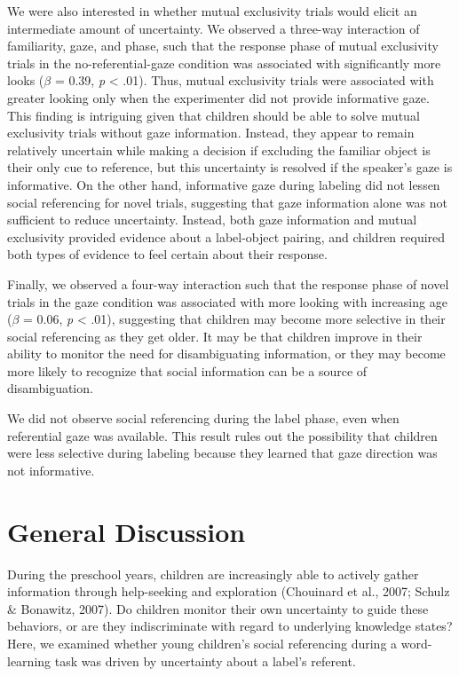 \documentclass[10pt, letterpaper]{article}
\begin{document}
We were also interested in whether mutual exclusivity trials would
elicit an intermediate amount of uncertainty. We observed a three-way
interaction of familiarity, gaze, and phase, such that the response
phase of mutual exclusivity trials in the no-referential-gaze condition
was associated with significantly more looks (\emph{\(\beta\)} = 0.39,
\emph{p} \textless{} .01). Thus, mutual exclusivity trials were
associated with greater looking only when the experimenter did not
provide informative gaze. This finding is intriguing given that children
should be able to solve mutual exclusivity trials without gaze
information. Instead, they appear to remain relatively uncertain while
making a decision if excluding the familiar object is their only cue to
reference, but this uncertainty is resolved if the speaker's gaze is
informative. On the other hand, informative gaze during labeling did not
lessen social referencing for novel trials, suggesting that gaze
information alone was not sufficient to reduce uncertainty. Instead,
both gaze information and mutual exclusivity provided evidence about a
label-object pairing, and children required both types of evidence to
feel certain about their response.

Finally, we observed a four-way interaction such that the response phase
of novel trials in the gaze condition was associated with more looking
with increasing age (\emph{\(\beta\)} = 0.06, \emph{p} \textless{} .01),
suggesting that children may become more selective in their social
referencing as they get older. It may be that children improve in their
ability to monitor the need for disambiguating information, or they may
become more likely to recognize that social information can be a source
of disambiguation.

We did not observe social referencing during the label phase, even when
referential gaze was available. This result rules out the possibility
that children were less selective during labeling because they learned
that gaze direction was not informative.

\section{General Discussion}\label{general-discussion}

During the preschool years, children are increasingly able to actively
gather information through help-seeking and exploration (Chouinard et
al., 2007; Schulz \& Bonawitz, 2007). Do children monitor their own
uncertainty to guide these behaviors, or are they indiscriminate with
regard to underlying knowledge states? Here, we examined whether young
children's social referencing during a word-learning task was driven by
uncertainty about a label's referent.
\end{document}

